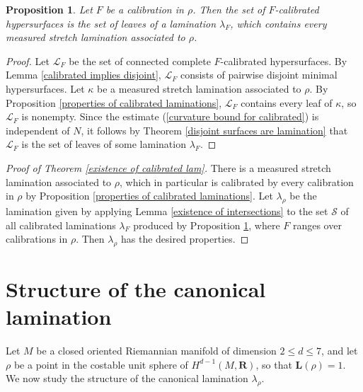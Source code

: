 \documentclass[reqno,11pt]{amsart}
\newcommand{\RR}{\mathbf{R}}
\newcommand{\Comass}{\mathbf L}
\newtheorem{proposition}[theorem]{Proposition}
\theoremstyle{definition}
\numberwithin{equation}{section}
\begin{document}
\begin{proposition}\label{existence of semicanonical lamination}
Let $F$ be a calibration in $\rho$.
Then the set of $F$-calibrated hypersurfaces is the set of leaves of a lamination $\lambda_F$, which contains every measured stretch lamination associated to $\rho$.
\end{proposition}
\begin{proof}
Let $\mathscr L_F$ be the set of connected complete $F$-calibrated hypersurfaces.
By Lemma \ref{calibrated implies disjoint}, $\mathscr L_F$ consists of pairwise disjoint minimal hypersurfaces.
Let $\kappa$ be a measured stretch lamination associated to $\rho$.
By Proposition \ref{properties of calibrated laminations}, $\mathscr L_F$ contains every leaf of $\kappa$, so $\mathscr L_F$ is nonempty.
Since the estimate (\ref{curvature bound for calibrated}) is independent of $N$, it follows by Theorem \ref{disjoint surfaces are lamination} that $\mathscr L_F$ is the set of leaves of some lamination $\lambda_F$.
\end{proof}

\begin{proof}[Proof of Theorem \ref{existence of calibrated lam}]
There is a measured stretch lamination associated to $\rho$, which in particular is calibrated by every calibration in $\rho$ by Proposition \ref{properties of calibrated laminations}.
Let $\lambda_\rho$ be the lamination given by applying Lemma \ref{existence of intersections} to the set $\mathscr S$ of all calibrated laminations $\lambda_F$ produced by Proposition \ref{existence of semicanonical lamination}, where $F$ ranges over calibrations in $\rho$.
Then $\lambda_\rho$ has the desired properties.
\end{proof}


\section{Structure of the canonical lamination}\label{canonical structure}
Let $M$ be a closed oriented Riemannian manifold of dimension $2 \leq d \leq 7$, and let $\rho$ be a point in the costable unit sphere of $H^{d - 1}(M, \RR)$, so that $\Comass(\rho) = 1$.
We now study the structure of the canonical lamination $\lambda_\rho$.

\end{document}
